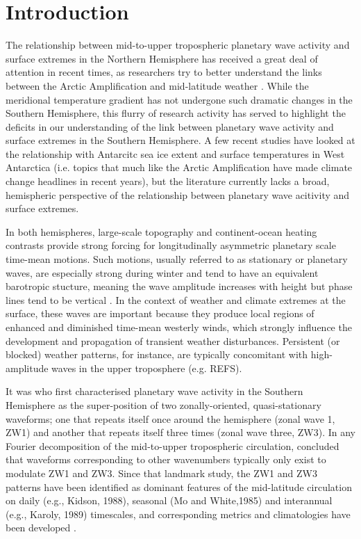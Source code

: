 \section{Introduction}\label{s:introduction}

The relationship between mid-to-upper tropospheric planetary wave activity and surface extremes in the Northern Hemisphere has received a great deal of attention in recent times, as researchers try to better understand the links between the Arctic Amplification and mid-latitude weather \citep[e.g.][]{Cohen2014,Screen2014}. While the meridional temperature gradient has not undergone such dramatic changes in the Southern Hemisphere, this flurry of research activity has served to highlight the deficits in our understanding of the link between planetary wave activity and surface extremes in the Southern Hemisphere. A few recent studies have looked at the relationship with Antarcitc sea ice extent \citep{Raphael2007,Raphael2014} and surface temperatures in West Antarctica \citep{Ding2011,Ding2013} (i.e. topics that much like the Arctic Amplification have made climate change headlines in recent years), but the literature currently lacks a broad, hemispheric perspective of the relationship between planetary wave acitivity and surface extremes. 

In both hemispheres, large-scale topography and continent-ocean heating contrasts provide strong forcing for longitudinally asymmetric planetary scale time-mean motions. Such motions, usually referred to as stationary or planetary waves, are especially strong during winter and tend to have an equivalent barotropic stucture, meaning the wave amplitude increases with height but phase lines tend to be vertical \citep{Holton2013}. In the context of weather and climate extremes at the surface, these waves are important because they produce local regions of enhanced and diminished time-mean westerly winds, which strongly influence the development and propagation of transient weather disturbances. Persistent (or blocked) weather patterns, for instance, are typically concomitant with high-amplitude waves in the upper troposphere (e.g. REFS).

It was \citet{vanLoon1972} who first characterised planetary wave activity in the Southern Hemisphere as the super-position of two zonally-oriented, quasi-stationary waveforms; one that repeats itself once around the hemisphere (zonal wave 1, ZW1) and another that repeats itself three times (zonal wave three, ZW3). In any Fourier decomposition of the mid-to-upper tropospheric circulation, \citet{vanLoon1972} concluded that waveforms corresponding to other wavenumbers typically only exist to modulate ZW1 and ZW3. Since that landmark study, the ZW1 and ZW3 patterns have been identified as dominant features of the mid-latitude circulation on daily (e.g., Kidson, 1988), seasonal (Mo and White,1985) and interannual (e.g., Karoly, 1989) timescales, and corresponding metrics and climatologies have been developed \citep{Raphael2004,Hobbs2007}.

